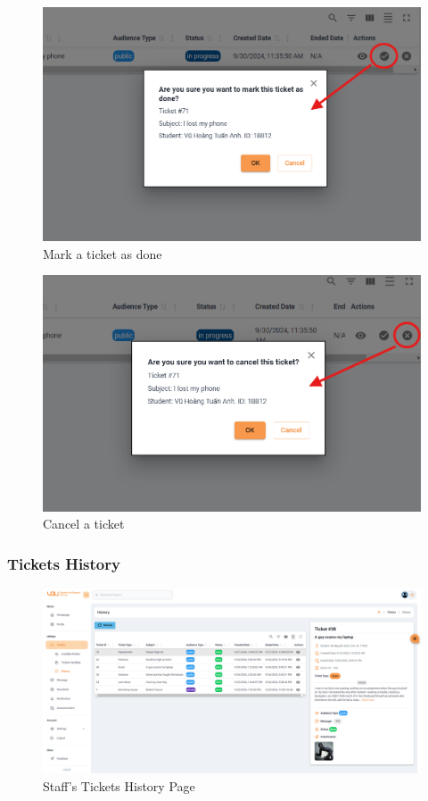 	
	\begin{figure}[H]
		\centering
		\includegraphics[width=0.7\linewidth]{graphics/gui/staff/ticket-handling-done}
		\caption{Mark a ticket as done}
		\label{fig:gui-st-ticket-handling-done}
	\end{figure}
	
	\begin{figure}[H]
		\centering
		\includegraphics[width=0.7\linewidth]{graphics/gui/staff/ticket-handling-cancel}
		\caption{Cancel a ticket}
		\label{fig:gui-st-ticket-handling-cancel}
	\end{figure}
	
	
	
	
	\subsubsection{Tickets History}
	\begin{figure}[H]
		\centering
		\includegraphics[width=1\linewidth]{graphics/gui/staff/ticket-history}
		\caption{Staff's Tickets History Page}
		\label{fig:gui-st-ticket-history}
	\end{figure}
	
